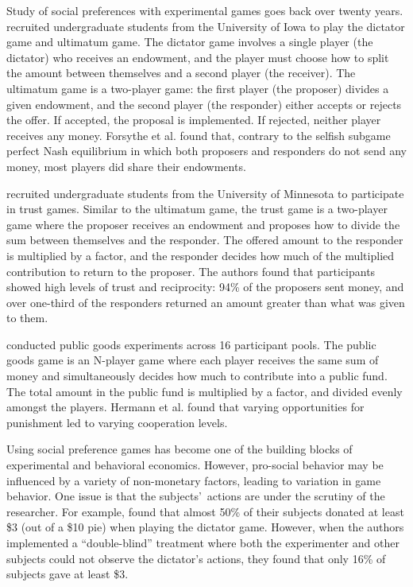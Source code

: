 \documentclass[12pt]{article}
\begin{document}
Study of social preferences with experimental games goes back over twenty years. \cite{forsythe_1994} recruited undergraduate students from the University of Iowa to play the dictator game and ultimatum game. The dictator game involves a single player (the dictator) who receives an endowment, and the player must choose how to split the amount between themselves and a second player (the receiver). The ultimatum game is a two-player game: the first player (the proposer) divides a given endowment, and the second player (the responder) either accepts or rejects the offer. If accepted, the proposal is implemented. If rejected, neither player receives any money. Forsythe et al. found that, contrary to the selfish subgame perfect Nash equilibrium in which both proposers and responders do not send any money, most players did share their endowments.

\cite{berg_1995} recruited undergraduate students from the University of Minnesota to participate in trust games. Similar to the ultimatum game, the trust game is a two-player game where the proposer receives an endowment and proposes how to divide the sum between themselves and the responder. The offered amount to the responder is multiplied by a factor, and the responder decides how much of the multiplied contribution to return to the proposer. The authors found that participants showed high levels of trust and reciprocity: 94\% of the proposers sent money, and over one-third of the responders returned an amount greater than what was given to them.

 \cite{hermann_thoni_gachter_2008} conducted public goods experiments across 16 participant pools. The public goods game is an N-player game where each player receives the same sum of money and simultaneously decides how much to contribute into a public fund. The total amount in the public fund is multiplied by a factor, and divided evenly amongst the players. Hermann et al. found that varying opportunities for punishment led to varying cooperation levels.

Using social preference games has become one of the building blocks of experimental and behavioral economics. However, pro-social behavior may be influenced by a variety of non-monetary factors, leading to variation in game behavior. One issue is that the subjects\rq \ actions are under the scrutiny of the researcher. For example, \cite{hoffman_1994} found that almost 50\% of their subjects donated at least \$3 (out of a \$10 pie) when playing the dictator game. However, when the authors implemented a ``double-blind'' treatment where both the experimenter and other subjects could not observe the dictator\rq s actions, they found that only 16\% of subjects gave at least \$3.
\end{document}
